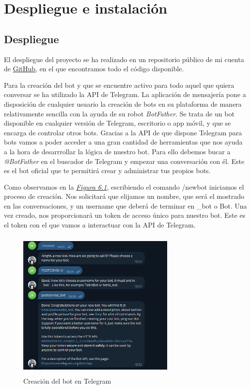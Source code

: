 \chapter{Despliegue e instalación}\vspace{1cm}


\section{Despliegue}

El despliegue del proyecto se ha realizado en un repositorio público de mi cuenta de \href{https://github.com/juantiog22}{GitHub}, en el que encontramos todo el código disponible. \vspace{0.3cm}

Para la creación del bot y que se encuentre activo para todo aquel que quiera conversar se ha utilizado la API de Telegram. La aplicación de mensajería pone a disposición de cualquier usuario la creación de bots en su plataforma de manera relativamente sencilla con la ayuda de su robot \textit{BotFather}. Se trata de un bot disponible en cualquier versión de Telegram, escritorio o app móvil, y que se encarga de controlar otros bots. Gracias a la API de que dispone Telegram para bots vamos a poder acceder a una gran cantidad de herramientas que nos ayuda a la hora de desarrrollar la lógica de nuestro bot. Para ello debemos bucar a \textit{@BotFather} en el buscador de Telegram y empezar una conversación con él. Este es el bot oficial que te permitirá crear y administrar tus propios bots. 

Como observamos en la \textit{\hyperref[fig:creacion-bot]{Figura 6.1}}, escribiendo el comando /newbot iniciamos el proceso de creación. Nos solicitará que elijamos un nombre, que será el mostrado en las conversaciones, y un username que deberá de terminar en \_bot o Bot. Una vez creado, nos proporcionará un token de acceso único para nuestro bot. Este es el token con el que vamos a interactuar con la API de Telegram. \vspace{2cm}

\begin{figure}[!ht]
    \centering
    \includegraphics[width=0.7\textwidth, height=7.5cm]{imagenes/bot_creation.png}
    \caption{ Creación del bot en Telegram }
    \label{fig:creacion-bot}
\end{figure}


